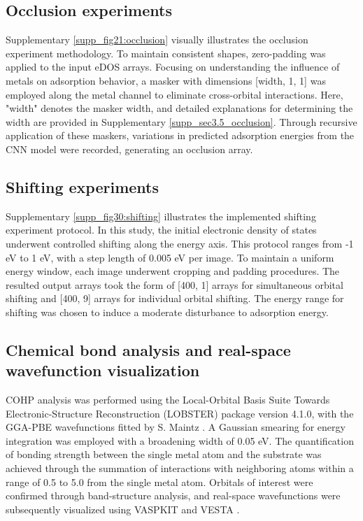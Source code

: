 \subsection{Occlusion experiments}
Supplementary \cref{supp_fig21:occlusion} visually illustrates the occlusion experiment methodology.
To maintain consistent shapes, zero-padding was applied to the input eDOS arrays.
Focusing on understanding the influence of metals on adsorption behavior, a masker with dimensions [width, 1, 1] was employed along the metal channel to eliminate cross-orbital interactions.
Here, "width" denotes the masker width, and detailed explanations for determining the width are provided in Supplementary \cref{supp_sec3.5_occlusion}.
Through recursive application of these maskers, variations in predicted adsorption energies from the CNN model were recorded, generating an occlusion array.

\subsection{Shifting experiments}
Supplementary \cref{supp_fig30:shifting} illustrates the implemented shifting experiment protocol.
In this study, the initial electronic density of states underwent controlled shifting along the energy axis.
This protocol ranges from -1 eV to 1 eV, with a step length of 0.005 eV per image.
To maintain a uniform energy window, each image underwent cropping and padding procedures.
The resulted output arrays took the form of [400, 1] arrays for simultaneous orbital shifting and [400, 9] arrays for individual orbital shifting.
The energy range for shifting was chosen to induce a moderate disturbance to adsorption energy.

\subsection{Chemical bond analysis and real-space wavefunction visualization}
COHP analysis was performed using the Local-Orbital Basis Suite Towards Electronic-Structure Reconstruction (LOBSTER) package  \cite{deringer2011crystal, koga1999analytical, nelson2020lobster, maintz2013analytic, dronskowski1993crystal} version 4.1.0, with the GGA-PBE wavefunctions fitted by S. Maintz \cite{koga1999analytical, maintz2016lobster}.
A Gaussian smearing for energy integration was employed with a broadening width of 0.05 eV.
The quantification of bonding strength between the single metal atom and the substrate was achieved through the summation of interactions with neighboring atoms within a range of 0.5 \text{\AA} to 5.0 \text{\AA} from the single metal atom.
Orbitals of interest were confirmed through band-structure analysis, and real-space wavefunctions were subsequently visualized using VASPKIT \cite{wang2021vaspkit} and VESTA \cite{momma2008vesta}.

